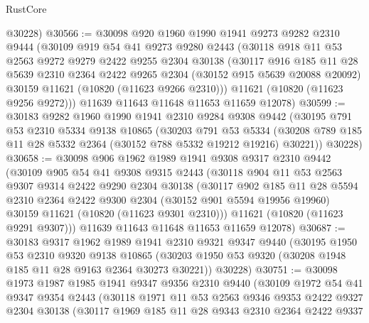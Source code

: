 \begin{lexlean}{RustCore}
\begin{coremodule}
      @30228)
@30566 := @30098
    @920
    @1960
    @1990
    @1941
    @9273
    @9282
    @2310
    @9444
    (@30109
      @919
      @54
      @41
      @9273
      @9280
      @2443
      (@30118
        @918
        @11
        @53
        @2563
        @9272
        @9279
        @2422
        @9255
        @2304
        @30138
        (@30117
          @916
          @185
          @11
          @28
          @5639
          @2310
          @2364
          @2422
          @9265
          @2304
          (@30152 @915 @5639 @20088 @20092)
          @30159
          @11621
          (@10820 (@11623 @9266 @2310)))
        @11621
        (@10820 (@11623 @9256 @9272)))
      @11639
      @11643
      @11648
      @11653
      @11659
      @12078)
@30599 := @30183
    @9282
    @1960
    @1990
    @1941
    @2310
    @9284
    @9308
    @9442
    (@30195
      @791
      @53
      @2310
      @5334
      @9138
      @10865
      (@30203
        @791
        @53
        @5334
        (@30208 @789 @185 @11 @28 @5332 @2364 (@30152 @788 @5332 @19212 @19216) @30221))
      @30228)
@30658 := @30098
    @906
    @1962
    @1989
    @1941
    @9308
    @9317
    @2310
    @9442
    (@30109
      @905
      @54
      @41
      @9308
      @9315
      @2443
      (@30118
        @904
        @11
        @53
        @2563
        @9307
        @9314
        @2422
        @9290
        @2304
        @30138
        (@30117
          @902
          @185
          @11
          @28
          @5594
          @2310
          @2364
          @2422
          @9300
          @2304
          (@30152 @901 @5594 @19956 @19960)
          @30159
          @11621
          (@10820 (@11623 @9301 @2310)))
        @11621
        (@10820 (@11623 @9291 @9307)))
      @11639
      @11643
      @11648
      @11653
      @11659
      @12078)
@30687 := @30183
    @9317
    @1962
    @1989
    @1941
    @2310
    @9321
    @9347
    @9440
    (@30195
      @1950
      @53
      @2310
      @9320
      @9138
      @10865
      (@30203 @1950 @53 @9320 (@30208 @1948 @185 @11 @28 @9163 @2364 @30273 @30221))
      @30228)
@30751 := @30098
    @1973
    @1987
    @1985
    @1941
    @9347
    @9356
    @2310
    @9440
    (@30109
      @1972
      @54
      @41
      @9347
      @9354
      @2443
      (@30118
        @1971
        @11
        @53
        @2563
        @9346
        @9353
        @2422
        @9327
        @2304
        @30138
        (@30117
          @1969
          @185
          @11
          @28
          @9343
          @2310
          @2364
          @2422
          @9337

\end{coremodule}
\end{lexlean}
